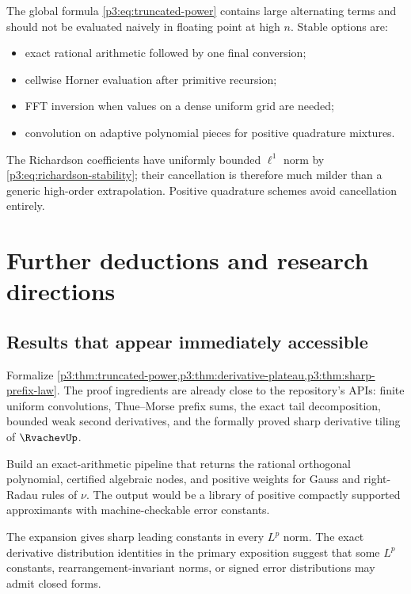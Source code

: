 \documentclass[11pt,oneside]{article}
\numberwithin{equation}{section}
\theoremstyle{definition}
\theoremstyle{remark}
\begin{document}
The global formula \cref{p3:eq:truncated-power} contains large alternating terms and should
not be evaluated naively in floating point at high $n$.  Stable options are:
\begin{itemize}[leftmargin=2em]
\item exact rational arithmetic followed by one final conversion;
\item cellwise Horner evaluation after primitive recursion;
\item FFT inversion when values on a dense uniform grid are needed;
\item convolution on adaptive polynomial pieces for positive quadrature mixtures.
\end{itemize}
The Richardson coefficients have uniformly bounded $\ell^1$ norm by
\cref{p3:eq:richardson-stability}; their cancellation is therefore much milder than a
generic high-order extrapolation.  Positive quadrature schemes avoid cancellation
entirely.

\section{Further deductions and research directions}
\label{p3:sec:future}

\subsection{Results that appear immediately accessible}

\begin{problem}
Formalize \cref{p3:thm:truncated-power,p3:thm:derivative-plateau,p3:thm:sharp-prefix-law}.
The proof ingredients are already close to the repository's APIs: finite uniform
convolutions, Thue--Morse prefix sums, the exact tail decomposition, bounded weak
second derivatives, and the formally proved sharp derivative tiling of $\RvachevUp$.
\end{problem}

\begin{problem}
Build an exact-arithmetic pipeline that returns the rational orthogonal polynomial,
certified algebraic nodes, and positive weights for Gauss and right-Radau rules of
$\nu$.  The output would be a library of positive compactly supported approximants with
machine-checkable error constants.
\end{problem}

\begin{problem}
The expansion gives sharp leading constants in every $L^p$ norm.  The exact derivative
distribution identities in the primary exposition suggest that some $L^p$ constants,
rearrangement-invariant norms, or signed error distributions may admit closed forms.
\end{problem}
\end{document}
